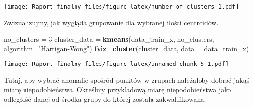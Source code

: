 \documentclass[
]{article}
\newenvironment{Shaded}{\begin{snugshade}}{\end{snugshade}}
\newcommand{\DataTypeTok}[1]{\textcolor[rgb]{0.13,0.29,0.53}{#1}}
\newcommand{\DecValTok}[1]{\textcolor[rgb]{0.00,0.00,0.81}{#1}}
\newcommand{\KeywordTok}[1]{\textcolor[rgb]{0.13,0.29,0.53}{\textbf{#1}}}
\newcommand{\NormalTok}[1]{#1}
\newcommand{\OperatorTok}[1]{\textcolor[rgb]{0.81,0.36,0.00}{\textbf{#1}}}
\newcommand{\StringTok}[1]{\textcolor[rgb]{0.31,0.60,0.02}{#1}}
\begin{document}
\texttt{[image: Raport\_finalny\_files/figure-latex/number of clusters-1.pdf]}

Zwizualizujmy, jak wygląda grupowanie dla wybranej ilości centroidów.

\begin{Shaded}
\begin{Highlighting}[]
\NormalTok{no_clusters =}\StringTok{ }\DecValTok{3}
\NormalTok{cluster_data =}\StringTok{ }\KeywordTok{kmeans}\NormalTok{(data_train_x, no_clusters, }\DataTypeTok{algorithm=}\StringTok{"Hartigan-Wong"}\NormalTok{)}
\KeywordTok{fviz_cluster}\NormalTok{(cluster_data, }\DataTypeTok{data =}\NormalTok{ data_train_x)}
\end{Highlighting}
\end{Shaded}

\texttt{[image: Raport\_finalny\_files/figure-latex/unnamed-chunk-5-1.pdf]}

Tutaj, aby wybrać anomalie spośród punktów w grupach należałoby dobrać
jakąś miarę niepodobieństwa. Określmy przykładową miarę niepodobieństwa
jako odległość danej od środka grupy do której została zakwalifikowana.

\begin{Shaded}
\end{Shaded}
\end{document}
